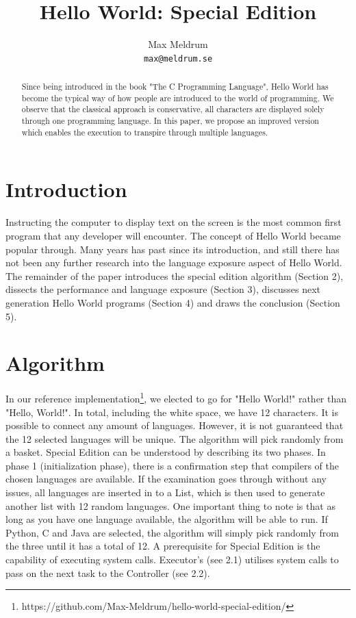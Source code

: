 \documentclass[11pt]{article}
\title{Hello World: Special Edition}
\author{Max Meldrum \\
{\tt max@meldrum.se}}
\date{}
\begin{document}
\maketitle
\begin{abstract}
Since being introduced in the book "The C Programming Language", Hello World has become the typical way of how people are introduced to the world of programming. We observe that the classical approach is conservative, all characters are displayed solely through one programming language. In this paper, we propose an improved version which enables the execution to transpire through multiple languages.
\end{abstract}

\section{Introduction}
Instructing the computer to display text on the screen is the most common first program that any developer will encounter. The concept of Hello World became popular through\cite{Kernighan:1988:CPL:576122}. Many years has past since its introduction, and still there has not been any further research into the language exposure aspect of Hello World.
\newline{}\newline{}
The remainder of the paper introduces the special edition algorithm (Section 2), dissects the performance and language exposure (Section 3), discusses next generation Hello World programs (Section 4) and draws the conclusion (Section 5).

\section{Algorithm}
In our reference implementation\footnote{https://github.com/Max-Meldrum/hello-world-special-edition/}, we elected to go for "Hello World!" rather than "Hello, World!". In total, including the white space, we have 12 characters. It is possible to connect any amount of languages. However, it is not guaranteed that the 12 selected languages will be unique. The algorithm will pick randomly from a basket.
\newline{}\newline{}
Special Edition can be understood by describing its two phases. In phase 1 (initialization phase), there is a confirmation step that compilers of the chosen languages are available. If the examination goes through without any issues, all languages are inserted in to a List, which is then used to generate another list with 12 random languages. One important thing to note is that as long as you have one language available, the algorithm will be able to run. If Python, C and Java are selected, the algorithm will simply pick randomly from the three until it has a total of 12.
\newline{}\newline{}
A prerequisite for Special Edition is the capability of executing system calls. Executor's (see 2.1) utilises system calls to pass on the next task to the Controller (see 2.2).
\end{document}
